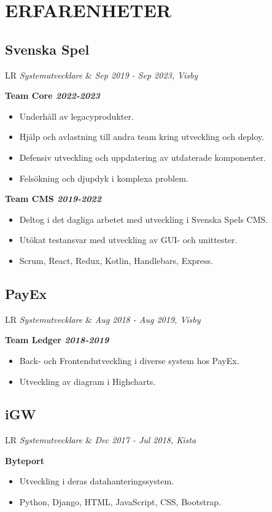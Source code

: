 \documentclass[11pt,a4paper]{moderncv}
\newcommand*{\experienceentry}[5][1.5mm]{
    \subsection{#2} \vspace{-1.5mm}
    \begin{tabularx}{\textwidth}{LR}
        {\itshape #3} & {\itshape #4, #5}
    \end{tabularx}
    \par\addvspace{#1}
}
\begin{document}
\begin{minipage}[t]{0.62\textwidth}
\section{ERFARENHETER}
\experienceentry{Svenska Spel}{Systemutvecklare}{Sep 2019 - Sep 2023}{Visby}

\textbf{Team Core \textit{2022-2023}}
\begin{itemize}
    \item Underhåll av legacyprodukter.
    \item Hjälp och avlastning till andra team kring utveckling och deploy.
    \item Defensiv utveckling och uppdatering av utdaterade komponenter.
    \item Felsökning och djupdyk i komplexa problem.
\end{itemize}
\vspace{1.0mm}

\textbf{Team CMS \textit{2019-2022}}
\begin{itemize}
    \item Deltog i det dagliga arbetet med utveckling i Svenska Spels CMS.
    \item Utökat testansvar med utveckling av GUI- och unittester.
    \item Scrum, React, Redux, Kotlin, Handlebars, Express.
\end{itemize}
\vspace{2.0mm}

\experienceentry{PayEx}{Systemutvecklare}{Aug 2018 - Aug 2019}{Visby}

\textbf{Team Ledger \textit{2018-2019}}
\begin{itemize}
  \item Back- och Frontendutveckling i diverse system hos PayEx.
  \item Utveckling av diagram i Highcharts.
\end{itemize}
\vspace{2.0mm}

\experienceentry{iGW}{Systemutvecklare}{Dec 2017 - Jul 2018}{Kista}
\textbf{Byteport}
\begin{itemize}
  \item Utveckling i deras datahanteringssystem.
  \item Python, Django, HTML, JavaScript, CSS, Bootstrap.
\end{itemize}
\vspace{2.0mm}


\end{minipage}
\end{document}
